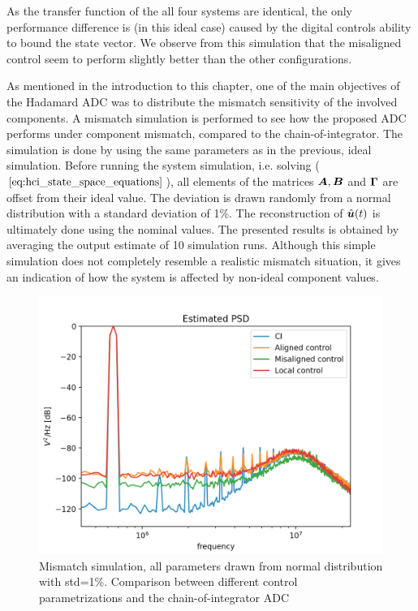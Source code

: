As the transfer function of the all four systems are identical, the only performance difference is (in this ideal case) caused by the digital controls ability to bound the state vector. We observe from this simulation that the misaligned control seem to perform slightly better than the other configurations.

As mentioned in the introduction to this chapter, one of the main objectives of the Hadamard ADC was to distribute the mismatch sensitivity of the involved components. A mismatch simulation is performed to see how the proposed ADC performs under component mismatch, compared to the chain-of-integrator. The simulation is done by using the same parameters as in the previous, ideal simulation. Before running the system simulation, i.e. solving ($\ref{eq:hci_state_space_equations}$), all elements of the matrices $\bm{A}, \bm{B}$ and $\bm{\Gamma}$ are offset from their ideal value. The deviation is drawn randomly from a normal distribution with a standard deviation of 1\%. The reconstruction of $\hat{\bm{u}}(t)$ is ultimately done using the nominal values. The presented results is obtained by averaging the output estimate of 10 simulation runs. Although this simple simulation does not completely resemble a realistic mismatch situation, it gives an indication of how the system is affected by non-ideal component values.

\begin{figure}[htbp]
    \centering
    \includegraphics[width=\linewidth]{figures/05hadamard/mismatch_sim.png}
    \caption{Mismatch simulation, all parameters drawn from normal distribution with std=1\%. Comparison between different control parametrizations and the chain-of-integrator ADC}
    \label{fig:hci_mismatch_sim}
\end{figure}


